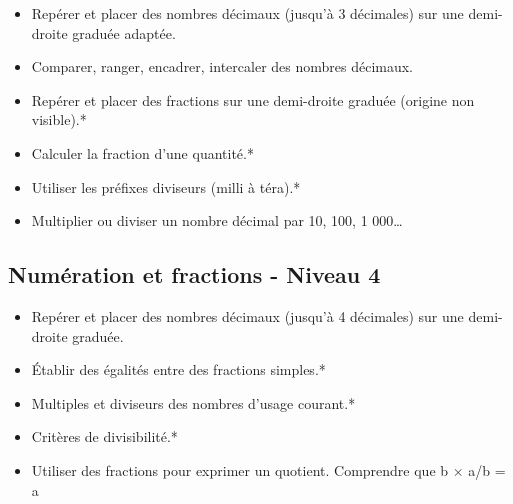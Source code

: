 \documentclass[a4paper,12pt,fleqn]{article}
\begin{document}
\begin{itemize}
	\item {}Repérer et placer des nombres décimaux (jusqu’à 3 décimales) sur une demi-droite graduée adaptée.
	\item {}Comparer, ranger, encadrer, intercaler des nombres décimaux.
	\item {}Repérer et placer des fractions sur une demi-droite graduée (origine non visible).*
	\item {}Calculer la fraction d’une quantité.*
	\item {}Utiliser les préfixes diviseurs (milli à téra).*
	\item {}Multiplier ou diviser un nombre décimal par 10, 100, 1 000…
\end{itemize}

\subsection*{Numération et fractions - Niveau 4}

\begin{itemize}
	\item {}Repérer et placer des nombres décimaux (jusqu’à 4 décimales) sur une demi-droite graduée.
	\item {}Établir des égalités entre des fractions simples.*
	\item {}Multiples et diviseurs des nombres d’usage courant.*
	\item {}Critères de divisibilité.*
	\item {}Utiliser des fractions pour exprimer un quotient. Comprendre que b × a/b = a
\end{itemize}

	
\end{document}
